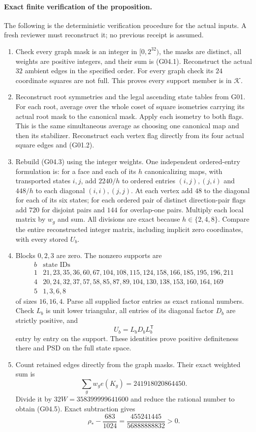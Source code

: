 \documentclass[11pt]{article}
\begin{document}
\paragraph{Exact finite verification of the proposition.}
The following is the deterministic verification procedure for the
actual inputs.  A fresh reviewer must reconstruct it; no previous
receipt is assumed.
\begin{enumerate}
\item Check every graph mask is an integer in \([0,2^{32})\), the masks
are distinct, all weights are positive integers, and their sum is
(G04.1).
Reconstruct the actual \(32\) ambient edges in the specified order.
For every graph check its \(24\) coordinate squares are not full.
This proves every support member is in \(\mathcal K\).
\item Reconstruct root symmetries and the legal ascending state tables
from G01.  For each root, average over the whole coset of square
isometries carrying its actual root mask to the canonical mask.
Apply each isometry to both flags.  This is the same simultaneous
average as choosing one canonical map and then its stabilizer.
Reconstruct each vertex flag directly from its four actual square
edges and (G01.2).
\item Rebuild (G04.3) using the integer weights.
One independent ordered-entry formulation is: for a face and each of
its \(h\) canonicalizing maps, with transported states \(i,j\), add
\(2240/h\) to ordered entries \((i,j),(j,i)\) and \(448/h\) to each
diagonal \((i,i),(j,j)\).
At each vertex add \(48\) to the diagonal for each of its six states;
for each ordered pair of distinct direction-pair flags add \(720\)
for disjoint pairs and \(144\) for overlap-one pairs.
Multiply each local matrix by \(w_g\) and sum.
All divisions are exact because \(h\in\{2,4,8\}\).
Compare the entire reconstructed integer matrix, including implicit
zero coordinates, with every stored \(U_b\).
\item Blocks \(0,2,3\) are zero.
The nonzero supports are
\[
\begin{array}{c|l}
b&\text{state IDs}\\ \hline
1&21,23,35,36,60,67,104,108,115,124,158,166,185,195,196,211\\
4&20,24,32,37,57,58,85,87,89,104,130,138,153,160,164,169\\
5&1,3,6,8
\end{array}
\]
of sizes \(16,16,4\).
Parse all supplied factor entries as exact rational numbers.
Check \(L_b\) is unit lower triangular, all entries of its diagonal
factor \(D_b\) are strictly positive, and
\[
 U_b=L_bD_bL_b^{\mathsf T}
 \tag{G04.6}
\]
entry by entry on the support.  These identities prove positive
definiteness there and PSD on the full state space.
\item Count retained edges directly from the graph masks.
Their exact weighted sum is
\[
 \sum_g w_ge(K_g)=241918020864450.
 \tag{G04.7}
\]
Divide it by \(32W=358399999641600\) and reduce the rational number
to obtain (G04.5).  Exact subtraction gives
\[
 \rho_*-\frac{683}{1024}
 =\frac{455241445}{56888888832}>0.
 \tag{G04.8}
\]
\end{enumerate}
\end{document}
